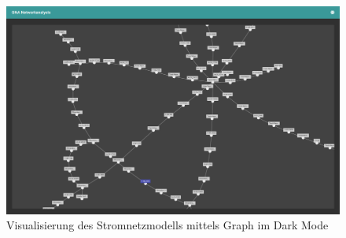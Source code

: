 \begin{figure}
    \centering
    \includegraphics[width=1\textwidth]{content/img/Empire/Frontend/Angular_Graph_Prototype_Dark.png}
    \caption{Visualisierung des Stromnetzmodells mittels Graph im Dark Mode}
    \label{fig:AngularGraphPrototypeDark}
\end{figure}
\FloatBarrier